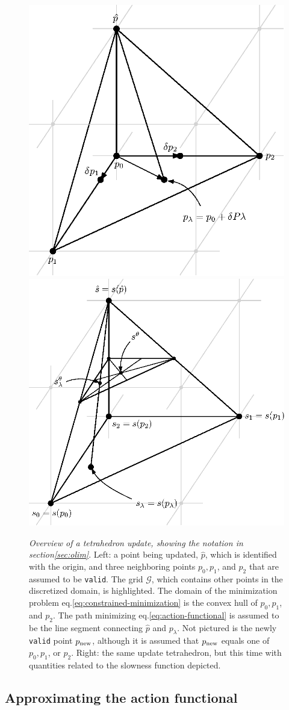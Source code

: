 \documentclass[smallcondensed]{svjour3}
\begin{document}
\begin{figure}
  \centering
  \includegraphics[width=.39864\textwidth]{simplex-diagram-2.eps}
  \hspace{3em}
  \includegraphics[width=.43912\textwidth]{slowness-tetra-2.eps}
  \caption{\emph{Overview of a tetrahedron update, showing the
      notation in section\@ \ref{sec:olim}}. Left: a point being
    updated, $\hat{p}$, which is identified with the origin, and three
    neighboring points $p_0, p_1$, and $p_2$ that are assumed to be
    \texttt{valid}. The grid $\mathcal{G}$, which contains other
    points in the discretized domain, is highlighted. The domain of
    the minimization problem eq.\@ \ref{eq:constrained-minimization}
    is the convex hull of $p_0, p_1$, and $p_2$. The path minimizing
    eq.\@ \ref{eq:action-functional} is assumed to be the line segment
    connecting $\hat{p}$ and $p_\lambda$. Not pictured is the newly
    \texttt{valid} point $p_{\operatorname{new}}$, although it is assumed that $p_{\operatorname{new}}$
    equals one of $p_0, p_1$, or $p_2$. Right: the same update
    tetrahedron, but this time with quantities related to the slowness
    function depicted.}\label{fig:simplex-diagrams}
\end{figure}

\subsection{Approximating the action functional}\label{ssec:quadrature}
\end{document}
